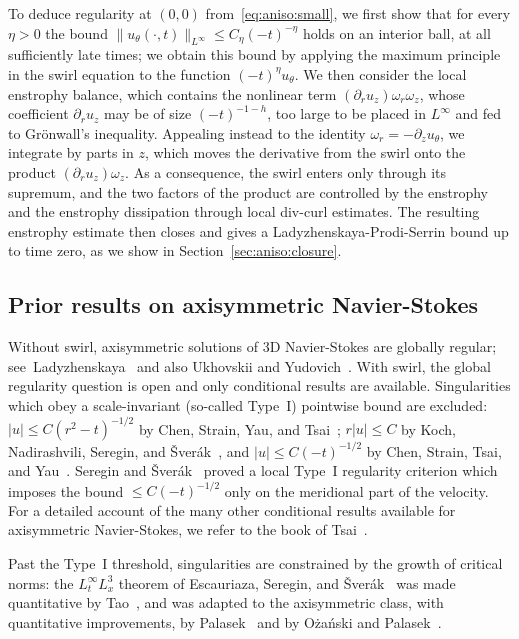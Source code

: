\documentclass[11pt,reqno]{amsproc}
\numberwithin{equation}{section}
\theoremstyle{remark}
\newcommand{\p}{\partial}
\begin{document}
To deduce regularity at $(0,0)$ from~\eqref{eq:aniso:small}, we first show that for every $\eta>0$ the bound $\|u_\theta(\cdot,t)\|_{L^\infty}\le C_\eta(-t)^{-\eta}$ holds on an interior ball, at all sufficiently late times; we obtain this bound by applying the maximum principle in the swirl equation to the function $(-t)^\eta u_\theta$. We then consider the local enstrophy balance, which contains the nonlinear term $(\p_ru_z)\omega_r\omega_z$, whose coefficient $\p_ru_z$ may be of size $(-t)^{-1-h}$, too large to be placed in $L^\infty$ and fed to Gr\"onwall's inequality. Appealing instead to the identity $\omega_r=-\p_zu_\theta$, we integrate by parts in $z$, which moves the derivative from the swirl onto the product $(\p_ru_z)\omega_z$. As a consequence, the swirl enters only through its supremum, and the two factors of the product are controlled by the enstrophy and the enstrophy dissipation through local div-curl estimates. The resulting enstrophy estimate then closes and gives a Ladyzhenskaya-Prodi-Serrin bound up to time zero, as we show in Section~\ref{sec:aniso:closure}.


\subsection{Prior results on axisymmetric Navier-Stokes}
\label{sec:aniso:prior}
Without swirl, axisymmetric solutions of 3D Navier-Stokes are globally regular; see~Ladyzhenskaya~\cite{Ladyzhenskaya68} and also Ukhovskii and Yudovich~\cite{UY68}. With swirl, the global regularity question is open and only conditional results are available. Singularities which obey a scale-invariant (so-called Type~I) pointwise bound are excluded: $|u|\le C(r^2-t)^{-1/2}$ by Chen, Strain, Yau, and Tsai~\cite{CSTY08}; $r|u|\le C$ by Koch, Nadirashvili, Seregin, and \v{S}ver\'ak~\cite{KNSS09}, and $|u|\le C(-t)^{-1/2}$ by Chen, Strain, Tsai, and Yau~\cite{CSTY09}. Seregin and \v{S}ver\'ak~\cite{SereginSverak09} proved a local Type~I regularity criterion which imposes the bound $\le C (-t)^{-1/2}$ only on the meridional part of the velocity. For a detailed account of the many other conditional results available for axisymmetric Navier-Stokes, we refer to the book of Tsai~\cite[Chapter~10]{Tsai18}.

Past the Type~I threshold, singularities are constrained by the growth of critical norms: the $L^\infty_tL^3_x$ theorem of Escauriaza, Seregin, and \v{S}ver\'ak~\cite{ESS03} was made quantitative by Tao~\cite{Tao21}, and was adapted to the axisymmetric class, with quantitative improvements, by Palasek~\cite{Palasek21} and by O\.za\'nski and Palasek~\cite{OzanskiPalasek23}.
\end{document}
